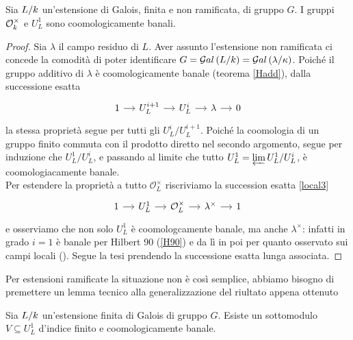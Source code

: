 \begin{theorem}
	Sia $ L/k $ un'estensione di Galois, finita e non ramificata, di gruppo $ G $. I gruppi $ \mathcal{O}_{k}^\times $ e $ U_L^1 $ sono coomologicamente banali.
\end{theorem}
\begin{proof}
	Sia $ \lambda $ il campo residuo di $ L $. Aver assunto l'estensione non ramificata ci concede la comodità di poter identificare $ G = \mathcal{G}al\left( L/k \right) = \mathcal{G}al\left( \lambda / \kappa \right) $. Poiché il gruppo additivo di $ \lambda $ è coomologicamente banale (teorema \ref{Hadd}), dalla successione esatta
	\[\begin{tikzcd}[column sep = small]
	1 \rar
	& U_L^{i+1} \rar
	& U_{L}^i \rar
	& \lambda \rar
	& 0
	\end{tikzcd}\]
	la stessa proprietà segue per tutti gli $ U^i_{L} / U^{i+1}_{L} $.
	Poiché la coomologia di un gruppo finito commuta con il prodotto diretto nel secondo argomento, segue per induzione che $ U^1_{L} / U^{i}_{L} $, e passando al limite che tutto $ U^1_L = \varprojlim U^1_{L} / U^{i}_{L} $, è coomologiacamente banale. \\
	
	Per estendere la proprietà a tutto $ \mathcal{O}_{L}^\times $ riscriviamo la succession esatta \ref{local3}
	\begin{equation*}
	\begin{tikzcd}[column sep = small]
	1 \rar
	& U_L^{1} \rar
	& \mathcal{O}_{L}^\times \rar
	& \lambda^\times \rar
	&1
	\end{tikzcd}
	\end{equation*}
	e osserviamo che non solo $  U^1_L $ è coomologcamente banale, ma anche $ \lambda^\times $: infatti in grado $ i = 1 $ è banale per Hilbert 90 (\ref{H90}) e da lì in poi per quanto osservato sui campi locali (\todo[riferimento]). Segue la tesi prendendo la successione esatta lunga associata.
\end{proof}

Per estensioni ramificate la situazione non è così semplice, abbiamo bisogno di premettere un lemma tecnico alla generalizzazione del riultato appena ottenuto

\begin{lemma}
	Sia $ L/k $ un'estensione finita di Galois di gruppo $ G $. Esiste un sottomodulo $ V \subseteq U_L^1 $ d'indice finito e coomologicamente banale.
\end{lemma}

